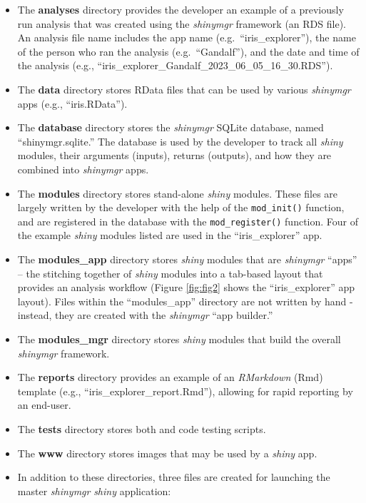 \begin{itemize}
\item
  The \textbf{analyses} directory provides the developer an example of a previously run analysis that was created using the \emph{shinymgr} framework (an RDS file). An analysis file name includes the app name (e.g.~``iris\_explorer''), the name of the person who ran the analysis (e.g.~``Gandalf''), and the date and time of the analysis (e.g., ``iris\_explorer\_Gandalf\_2023\_06\_05\_16\_30.RDS'').
\item
  The \textbf{data} directory stores RData files that can be used by various \emph{shinymgr} apps (e.g., ``iris.RData'').
\item
  The \textbf{database} directory stores the \emph{shinymgr} SQLite database, named ``shinymgr.sqlite.'' The database is used by the developer to track all \emph{shiny} modules, their arguments (inputs), returns (outputs), and how they are combined into \emph{shinymgr} apps.
\item
  The \textbf{modules} directory stores stand-alone \emph{shiny} modules. These files are largely written by the developer with the help of the \texttt{mod\_init()} function, and are registered in the database with the \texttt{mod\_register()} function. Four of the example \emph{shiny} modules listed are used in the ``iris\_explorer'' app.
\item
  The \textbf{modules\_app} directory stores \emph{shiny} modules that are \emph{shinymgr} ``apps'' -- the stitching together of \emph{shiny} modules into a tab-based layout that provides an analysis workflow (Figure \ref{fig:fig2} shows the
  ``iris\_explorer'' app layout). Files within the ``modules\_app'' directory are not written by hand - instead, they are created with the \emph{shinymgr} ``app builder.''
\item
  The \textbf{modules\_mgr} directory stores \emph{shiny} modules that build the overall \emph{shinymgr} framework.
\item
  The \textbf{reports} directory provides an example of an \emph{RMarkdown} (Rmd) template (e.g., ``iris\_explorer\_report.Rmd''), allowing for rapid reporting by an end-user.
\item
  The \textbf{tests} directory stores both  \citep{testthat} and  \citep{shinytest} code testing scripts.
\item
  The \textbf{www} directory stores images that may be used by a \emph{shiny} app.
\item
  In addition to these directories, three files are created for launching the master \emph{shinymgr} \emph{shiny} application:


\end{itemize}
